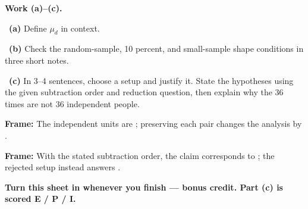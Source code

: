 \documentclass[11pt]{article}
\begin{document}
\newpage
\textbf{Work (a)--(c).}\par\smallskip

~\textbf{(a)} Define $\mu_d$ in context.\par
\workspace{0.8in}

~\textbf{(b)} Check the random-sample, 10 percent, and small-sample shape conditions in three short notes.\par
\workspace{1.4in}

~\textbf{(c)} In 3--4 sentences, choose a setup and justify it. State the hypotheses using the given subtraction order and reduction question, then explain why the 36 times are not 36 independent people.\par
\workspace{2.0in}

\begin{sentenceframebox}\raggedright\textbf{Frame:} The independent units are \blank[1.4in]; preserving each pair changes the analysis by \blank[2.6in].\end{sentenceframebox}

\begin{sentenceframebox}\raggedright\textbf{Frame:} With the stated subtraction order, the claim corresponds to \blank[1.2in]; the rejected setup instead answers \blank[2.5in].\end{sentenceframebox}

\textbf{Turn this sheet in whenever you finish --- bonus credit. Part (c) is scored E / P / I.}\par
\end{document}
